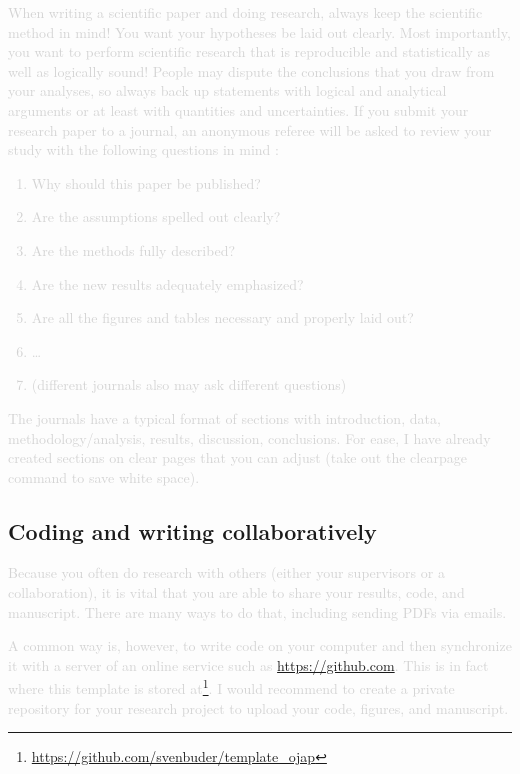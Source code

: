 \documentclass[twocolumn,apj,numberedappendix,appendixfloats]{openjournal}
\newcommand{\comment}[1]{\textcolor{lightgray}{#1}}
\begin{document}
\comment{When writing a scientific paper and doing research, always keep the scientific method in mind! You want your hypotheses be laid out clearly. Most importantly, you want to perform scientific research that is reproducible and statistically as well as logically sound! People may dispute the conclusions that you draw from your analyses, so always back up statements with logical and analytical arguments or at least with quantities and uncertainties. If you submit your research paper to a journal, an anonymous referee will be asked to review your study with the following questions in mind \citep{Bertout2004}:
\begin{enumerate}
    \item Why should this paper be published?
    \item Are the assumptions spelled out clearly?
    \item Are the methods fully described?
    \item Are the new results adequately emphasized?
    \item Are all the figures and tables necessary and properly laid out?
    \item \dots
    \item (different journals also may ask different questions)
\end{enumerate}}

\comment{The journals have a typical format of sections with introduction, data, methodology/analysis, results, discussion, conclusions. For ease, I have already created sections on clear pages that you can adjust (take out the clearpage command to save white space).}

\subsection{Coding and writing collaboratively}

\comment{Because you often do research with others (either your supervisors or a collaboration), it is vital that you are able to share your results, code, and manuscript. There are many ways to do that, including sending PDFs via emails.}

\comment{A common way is, however, to write code on your computer and then synchronize it with a server of an online service such as \url{https://github.com}. This is in fact where this template is stored at\footnote{\url{https://github.com/svenbuder/template_ojap}}. I would recommend to create a private repository for your research project to upload your code, figures, and manuscript.}
\end{document}
